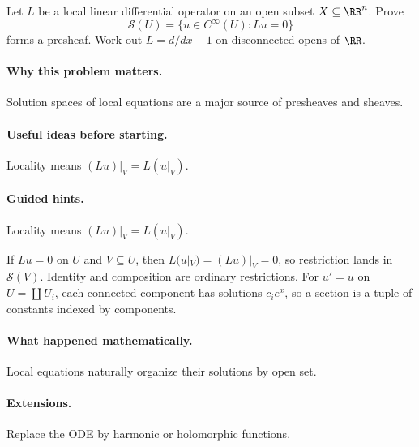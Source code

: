 \begin{problem}
Let $L$ be a local linear differential operator on an open subset $X\subseteq\RR^n$.  Prove
\[
\mathcal S(U)=\{u\in C^\infty(U):Lu=0\}
\]
forms a presheaf.  Work out $L=d/dx-1$ on disconnected opens of $\RR$.
\end{problem}

\paragraph{Why this problem matters.}
Solution spaces of local equations are a major source of presheaves and sheaves.

\paragraph{Useful ideas before starting.}
Locality means $(Lu)|_V=L(u|_V)$.

\paragraph{Guided hints.}
Locality means $(Lu)|_V=L(u|_V)$.

\begin{solution}
If $Lu=0$ on $U$ and $V\subseteq U$, then $L(u|_V)=(Lu)|_V=0$, so restriction lands in $\mathcal S(V)$.  Identity and composition are ordinary restrictions.  For $u'=u$ on $U=\coprod U_i$, each connected component has solutions $c_i e^x$, so a section is a tuple of constants indexed by components.
\end{solution}

\paragraph{What happened mathematically.}
Local equations naturally organize their solutions by open set.

\paragraph{Extensions.}
Replace the ODE by harmonic or holomorphic functions.
